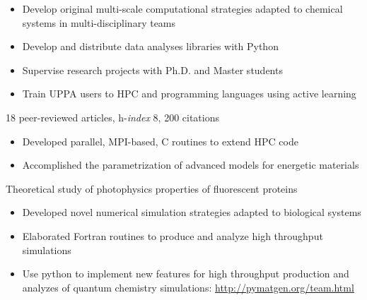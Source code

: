 \documentclass[10pt,a4paper,ragged2e,academicons]{../altacv}
\begin{document}
\begin{itemize}
\item Develop original multi-scale computational strategies adapted to chemical systems in multi-disciplinary teams
\item Develop and distribute data analyses libraries with Python
\item Supervise research projects with Ph.D. and Master students
\item Train UPPA users to HPC and programming languages using active learning
\end{itemize}
{\small 18 peer-reviewed articles, h-\textit{index} 8, 200 citations \hfill {}}

\bigskip

\begin{itemize}
\item Developed parallel, MPI-based, C routines to extend HPC code
\item Accomplished the parametrization of advanced models for energetic materials
\end{itemize}

\bigskip

Theoretical study of photophysics properties of fluorescent proteins
\smallskip
\begin{itemize}
\item Developed novel numerical simulation strategies adapted to biological systems
\item Elaborated Fortran routines to produce and analyze high throughput simulations
\end{itemize}


\vspace{-2mm}
\begin{itemize}\setlength{\itemsep}{0ex}
    \item Use python to implement new features for high throughput production and analyzes of quantum chemistry simulations: \url{http://pymatgen.org/team.html}
\end{itemize}
\end{document}
